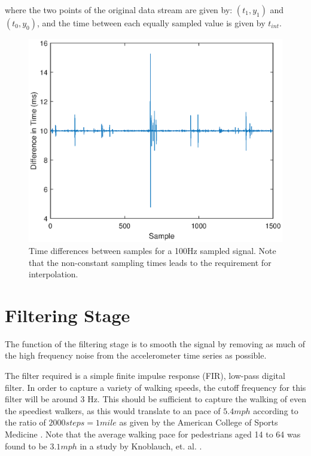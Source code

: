             where the two points of the original data stream are given by: $(t_1, y_1)$ and $(t_0, y_0)$, and the time between each equally sampled value is given by $t_{int}$.

            \begin{figure}[h]
                \includegraphics[width=\textwidth]{Images/sampling_freq.eps}
                \centering
                \caption{Time differences between samples for a 100Hz sampled signal. Note that the non-constant sampling times leads to the requirement for interpolation.}
                \label{img_sampling_freq}
            \end{figure}

        \section{Filtering Stage}

            The function of the filtering stage is to smooth the signal by removing as much of the high frequency noise from the accelerometer time series as possible.

            The filter required is a simple finite impulse response (FIR), low-pass digital filter. In order to capture a variety of walking speeds, the cutoff frequency for this filter will be around 3 Hz. This should be sufficient to capture the walking of even the speediest walkers, as this would translate to an pace of $5.4 mph$ according to the ratio of $2000 steps = 1 mile$ as given by the American College of Sports Medicine \cite{acsm}. Note that the average walking pace for pedestrians aged 14 to 64 was found to be $3.1 mph$ in a study by Knoblauch, et. al. \cite{walking_speed}.

